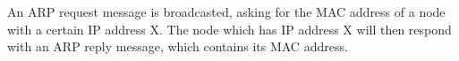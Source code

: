 An ARP request message is broadcasted, asking for the MAC address of a node with a certain IP address X. The node which has IP address X will then respond with an ARP reply message, which contains its MAC address.
